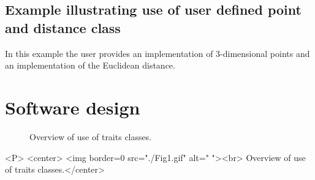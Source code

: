  


\subsection{Example illustrating use of user defined point and distance class}

In this example the user provides an implementation of 3-dimensional points and an
implementation of the Euclidean distance.


\section{Software design}

\begin{figure}[t]
\begin{ccTexOnly}
\begin{center}
\leavevmode
\vspace*{-6.5cm}
\end{center}
\vspace*{6cm}
\end{ccTexOnly}
\caption{Overview of use of traits classes.
\label{ASPAS:Fig1}}
\end{figure}

\begin{ccHtmlOnly}

<P>
<center>
<img border=0 src="./Fig1.gif" alt=" "><br> 
Overview of use of traits classes.</center>
\end{ccHtmlOnly}

